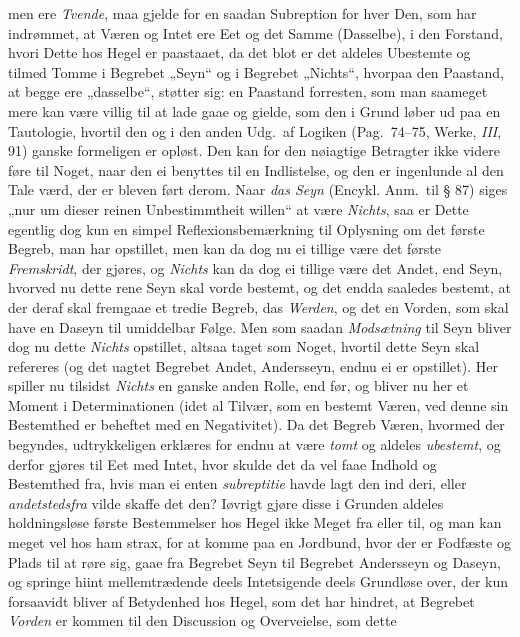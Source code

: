 \documentclass[12pt,a4paper]{book}
\newcommand{\apage}[1]{\marginnote{\footnotesize\textit{[#1]}}}
\begin{document}
men ere \emph{Tvende}, maa gjelde for en saadan Subreption for hver Den, som
har indrømmet, at Væren og Intet ere Eet og det Samme (Dasselbe), i
den Forstand, hvori Dette hos Hegel er paastaaet, da det blot er det
aldeles Ubestemte og tilmed Tomme i Begrebet „Seyn“ og i Begrebet
„Nichts“, hvorpaa den Paastand, at begge ere „dasselbe“, støtter sig:
en Paastand forresten, som man saameget mere kan være villig til at
lade gaae og gielde, som den i Grund løber ud paa en Tautologie,
hvortil \apage{36} den og i den anden Udg.\ af Logiken (Pag.\ 74--75, Werke, \textit{III},
91) ganske formeligen er opløst. Den kan for den nøiagtige Betragter
ikke videre føre til Noget, naar den ei benyttes til en Indlistelse,
og den er ingenlunde al den Tale værd, der er bleven ført derom. Naar
\emph{das Seyn} (Encykl. Anm.\ til § 87) siges „nur um dieser reinen
Unbestimmtheit willen“ at være \emph{Nichts}, saa er Dette egentlig dog kun
en simpel Reflexionsbemærkning til Oplysning om det første Begreb, man
har opstillet, men kan da dog nu ei tillige være det første
\emph{Fremskridt}, der gjøres, og \emph{Nichts} kan da dog ei tillige være det
Andet, end Seyn, hvorved nu dette rene Seyn skal vorde bestemt, og det
endda saaledes bestemt, at der deraf skal fremgaae et tredie Begreb,
das \emph{Werden}, og det en Vorden, som skal have en Daseyn til umiddelbar
Følge. Men som saadan \emph{Modsætning} til Seyn bliver dog nu dette \emph{Nichts}
opstillet, altsaa taget som Noget, hvortil dette Seyn skal refereres
(og det uagtet Begrebet Andet, Andersseyn, endnu ei er opstillet). Her
spiller nu tilsidst \emph{Nichts} en ganske anden Rolle, end før, og bliver
nu her et Moment i Determinationen (idet al Tilvær, som en bestemt
Væren, ved denne sin Bestemthed er beheftet med en Negativitet). Da
det Begreb Væren, hvormed der begyndes, udtrykkeligen erklæres for
endnu at være \emph{tomt} og aldeles \emph{ubestemt}, og derfor gjøres til Eet med
Intet, hvor skulde det da vel faae Indhold og Bestemthed fra, hvis man
ei enten \textit{subreptitie} havde lagt den ind deri, eller
\emph{andetstedsfra} vilde skaffe det den? Iøvrigt gjøre disse i
Grunden aldeles holdningsløse første Bestemmelser hos Hegel ikke Meget
fra eller til, og man kan meget vel hos ham strax, for at komme paa en
Jordbund, hvor der er Fodfæste og Plads til at røre sig, gaae fra
Begrebet Seyn til Begrebet Andersseyn og Daseyn, og springe hiint
mellemtrædende deels Intetsigende deels Grundløse over, der kun
forsaavidt bliver af Betydenhed hos Hegel, som det har hindret, at
Begrebet \emph{Vorden} er kommen til den Discussion og Overveielse, som dette
\end{document}
